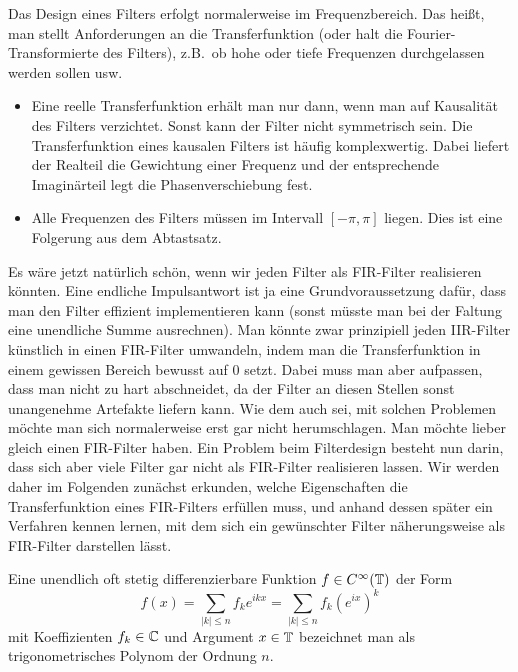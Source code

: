 \begin{remark}
Das Design eines Filters erfolgt normalerweise im Frequenzbereich. Das heißt, man stellt 
Anforderungen an die Transferfunktion (oder halt die Fourier-Transformierte des Filters), z.B.\ ob 
hohe oder tiefe Frequenzen durchgelassen werden sollen usw.
\begin{itemize}
\item Eine reelle Transferfunktion erhält man nur dann, wenn man auf Kausalität des Filters 
verzichtet. Sonst kann der Filter nicht symmetrisch sein. Die Transferfunktion eines kausalen 
Filters ist häufig komplexwertig. Dabei liefert der Realteil die Gewichtung einer Frequenz und der
entsprechende Imaginärteil legt die Phasenverschiebung fest.
\item Alle Frequenzen des Filters müssen im Intervall $ [-\pi, \pi] $ liegen. Dies ist eine 
Folgerung aus dem Abtastsatz.
\end{itemize}
\end{remark}

Es wäre jetzt natürlich schön, wenn wir jeden Filter als FIR-Filter realisieren könnten. Eine
endliche Impulsantwort ist ja eine Grundvoraussetzung dafür, dass man den Filter effizient 
implementieren kann (sonst müsste man bei der Faltung eine unendliche Summe ausrechnen). Man könnte
zwar prinzipiell jeden IIR-Filter künstlich in einen FIR-Filter umwandeln, indem man die 
Transferfunktion in einem gewissen Bereich bewusst auf $ 0 $ setzt. Dabei muss man aber aufpassen,
dass man nicht zu hart abschneidet, da der Filter an diesen Stellen sonst unangenehme Artefakte
liefern kann. Wie dem auch sei, mit solchen Problemen möchte man sich normalerweise erst gar nicht
herumschlagen. Man möchte lieber gleich einen FIR-Filter haben. Ein Problem beim Filterdesign 
besteht nun darin, dass sich aber viele Filter gar nicht als FIR-Filter realisieren lassen. Wir 
werden daher im Folgenden zunächst erkunden, welche Eigenschaften die Transferfunktion eines 
FIR-Filters erfüllen muss, und anhand dessen später ein Verfahren kennen lernen, mit dem sich ein
gewünschter Filter näherungsweise als FIR-Filter darstellen lässt.

\begin{definition}
Eine unendlich oft stetig differenzierbare Funktion $ f \in C^{\infty}(\mathbb{T}) $ der Form
\[
  f(x) = \sum_{|k| \leq n} f_{k} e^{ikx} = \sum_{|k| \leq n} f_{k} \left(e^{ix}\right)^{k}
\]
mit Koeffizienten $ f_{k} \in \mathbb{C} $ und Argument $ x \in \mathbb{T} $ bezeichnet man als trigonometrisches 
Polynom der Ordnung $ n $.
\end{definition}

